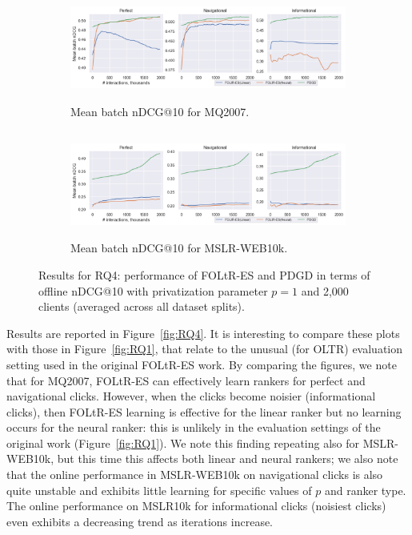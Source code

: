 \begin{figure}[t]
	\centering
	\begin{subfigure}{1\textwidth} \centering
		\includegraphics[width=13cm, height=3.5cm]{images/RQ4/mq2007_foltr_PDGD_offline nDCG_c2000_p1.0.png}
		\caption{Mean batch nDCG@10 for MQ2007.}
		\label{fig:mq2007-rq4-offline}
	\end{subfigure}
	\begin{subfigure}{1\textwidth} \centering
		\includegraphics[width=13cm, height=3.5cm]{images/RQ4/mslr10k_foltr_PDGD_offline nDCG_c2000_p1.0.png}
		\caption{Mean batch nDCG@10 for MSLR-WEB10k.}
		\label{fig:mslr10k-rq4-offline}
	\end{subfigure}
	\caption{Results for RQ4: performance of FOLtR-ES and PDGD in terms of offline nDCG@10 with privatization parameter $p=1$ and 2,000 clients (averaged across all dataset splits).\label{fig:RQ4-offline}} 
\end{figure}

Results are reported in Figure~\ref{fig:RQ4}. It is interesting to compare these plots with those in Figure~\ref{fig:RQ1}, that relate to the unusual (for OLTR) evaluation setting used in the original FOLtR-ES work. By comparing the figures, we note that for MQ2007, FOLtR-ES can effectively learn rankers for perfect and navigational clicks. However, when the clicks become noisier (informational clicks), then FOLtR-ES learning is effective for the linear ranker but no learning occurs for the neural ranker: this is unlikely in the evaluation settings of the original work (Figure~\ref{fig:RQ1}). We note this finding repeating also for MSLR-WEB10k, but this time this affects both linear and neural rankers; we also note that the online performance in MSLR-WEB10k on navigational clicks is also quite unstable and exhibits little learning for specific values of $p$ and ranker type. The online performance on MSLR10k for informational clicks (noisiest clicks) even exhibits a decreasing trend as iterations increase.

